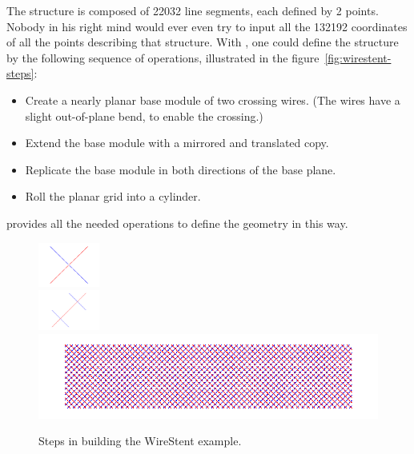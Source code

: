 The structure is composed of 22032 line segments, each defined by 2 points. Nobody in his right mind would ever even try to input all the 132192 coordinates of all the points describing that structure. 
With \pyformex, one could define the structure by the following sequence of operations, illustrated in the figure~\ref{fig:wirestent-steps}:
 \begin{itemize}
 \item Create a nearly planar base module of two crossing wires. (The wires have a slight out-of-plane bend, to enable the crossing.) 
 \item Extend the base module with a mirrored and translated copy.
 \item Replicate the base module in both directions of the base plane.
 \item Roll the planar grid into a cylinder.
 \end{itemize}
\pyf provides all the needed operations to define the geometry in this way.
 \begin{figure}[h]
   \centering
   \begin{makeimage}
   \end{makeimage}
   \begin{latexonly}
     \includegraphics[width=2cm]{images/wirestent-1}\\
     \includegraphics[width=2cm]{images/wirestent-2}\\
     \includegraphics[width=12cm]{images/wirestent-3}
   \end{latexonly}
   \begin{htmlonly}
   \end{htmlonly}  
   \caption{Steps in building the WireStent example.}   \label{fig:WireStent-steps}

 \end{figure}


